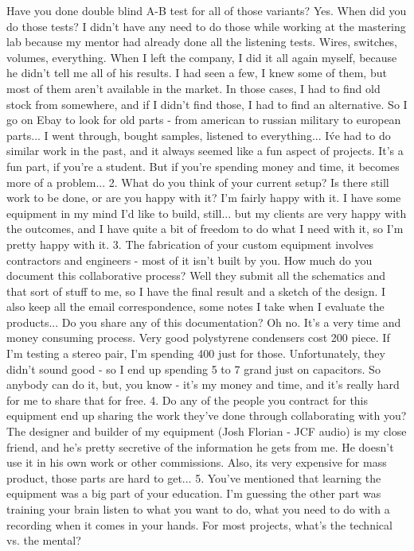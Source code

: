 Have you done double blind A-B test for all of those variants?
Yes.
When did you do those tests?
I didn't have any need to do those while working at the mastering lab because my mentor had already done all the listening tests. Wires, switches, volumes, everything. When I left the company, I did it all again myself, because he didn't tell me all of his results. I had seen a few, I knew some of them, but most of them aren't available in the market. In those cases, I had to find old stock from somewhere, and if I didn't find those, I had to find an alternative. So I go on Ebay to look for old parts - from american to russian military to european parts... I went through, bought samples, listened to everything...
I\'ve had to do similar work in the past, and it always seemed like a fun aspect of projects.
It's a fun part, if you're a student. But if you're spending money and time, it becomes more of a problem...
2. What do you think of your current setup? Is there still work to be done, or are you happy with it?
I'm fairly happy with it. I have some equipment in my mind I'd like to build, still... but my clients are very happy with the outcomes, and I have quite a bit of freedom to do what I need with it, so I'm pretty happy with it.
3. The fabrication of your custom equipment involves contractors and engineers - most of it isn't built by you. How much do you document this collaborative process?
Well they submit all the schematics and that sort of stuff to me, so I have the final result and a sketch of the design. I also keep all the email correspondence, some notes I take when I evaluate the products...
Do you share any of this documentation?
Oh no. It's a very time and money consuming process. Very good polystyrene condensers cost 200 piece. If I'm testing a stereo pair, I'm spending 400 just for those. Unfortunately, they didn't sound good - so I end up spending 5 to 7 grand just on capacitors. So anybody can do it, but, you know - it's my money and time, and it's really hard for me to share that for free.
4. Do any of the people you contract for this equipment end up sharing the work they've done through collaborating with you?
The designer and builder of my equipment (Josh Florian - JCF audio) is my close friend, and he's pretty secretive of the information he gets from me. He doesn't use it in his own work or other commissions. Also, its very expensive for mass product, those parts are hard to get...
5. You've mentioned that learning the equipment was a big part of your education. I'm guessing the other part was training your brain listen to what you want to do, what you need to do with a recording when it comes in your hands. For most projects, what's the technical vs. the mental?
